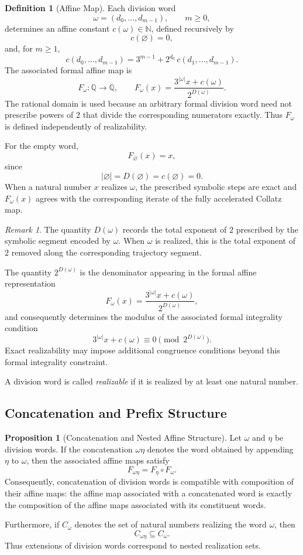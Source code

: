\documentclass[12pt, oneside]{article}
\numberwithin{equation}{section}
\theoremstyle{definition}
\newtheorem{definition}{Definition}[section]
\newtheorem{proposition}{Proposition}[section]
\theoremstyle{plain}
\theoremstyle{remark}
\newtheorem*{remark}{Remark}
\begin{document}
\begin{definition}[Affine Map]
Each division word
\[
\omega=(d_0,\dots,d_{m-1}),
\qquad m\ge0,
\]
determines an affine constant \(c(\omega)\in\mathbb{N}\), defined
recursively by
\[
c(\varnothing)=0,
\]
and, for \(m\ge1\),
\[
c(d_0,\dots,d_{m-1})
=
3^{m-1}
+
2^{d_0}\,
c(d_1,\dots,d_{m-1}).
\]
The associated formal affine map is
\[
F_\omega:\mathbb{Q}\to\mathbb{Q},
\qquad
F_\omega(x)
=
\frac{3^{|\omega|}x+c(\omega)}
     {2^{D(\omega)}}.
\]
The rational domain is used because an arbitrary formal division word need
not prescribe powers of \(2\) that divide the corresponding numerators
exactly. Thus \(F_\omega\) is defined independently of realizability.

For the empty word,
\[
F_{\varnothing}(x)=x,
\]
since
\[
|\varnothing|=D(\varnothing)=c(\varnothing)=0.
\]
When a natural number \(x\) realizes \(\omega\), the prescribed symbolic
steps are exact and \(F_\omega(x)\) agrees with the corresponding iterate
of the fully accelerated Collatz map.
\end{definition}

\begin{remark}
The quantity \(D(\omega)\) records the total exponent of \(2\) prescribed by
the symbolic segment encoded by \(\omega\). When \(\omega\) is realized, this
is the total exponent of \(2\) removed along the corresponding trajectory
segment.

The quantity \(2^{D(\omega)}\) is the denominator appearing in the formal
affine representation
\[
F_\omega(x)
=
\frac{3^{|\omega|}x+c(\omega)}{2^{D(\omega)}},
\]
and consequently determines the modulus of the associated formal
integrality condition
\[
3^{|\omega|}x+c(\omega)\equiv0 \pmod{2^{D(\omega)}}.\]
Exact realizability may impose additional congruence conditions beyond
this formal integrality constraint.

A division word is called \emph{realizable} if it is realized by at least
one natural number.
\end{remark}

\subsection{Concatenation and Prefix Structure}

\begin{proposition}[Concatenation and Nested Affine Structure]
Let $\omega$ and $\eta$ be division words. If the concatenation
$\omega\eta$ denotes the word obtained by appending $\eta$ to $\omega$,
then the associated affine maps satisfy
\[
F_{\omega\eta} = F_\eta \circ F_\omega .
\]
Consequently, concatenation of division words is compatible with
composition of their affine maps: the affine map associated with
a concatenated word is exactly the composition of the affine maps
associated with its constituent words.

Furthermore, if $C_\omega$ denotes the set of natural numbers
realizing the word $\omega$, then
\[
C_{\omega\eta}\subseteq C_\omega .
\]
Thus extensions of division words correspond to nested realization
sets.
\end{proposition}
\end{document}
